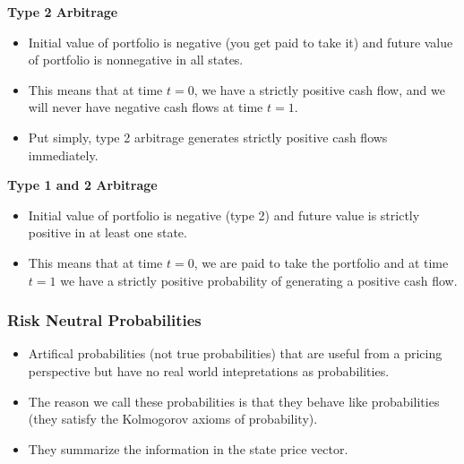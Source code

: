 \documentclass[11pt]{article}
\begin{document}
\textbf{Type 2 Arbitrage}
\begin{itemize}
    \item Initial value of portfolio is negative (you get paid to take it) and future value of 
    portfolio is nonnegative in all states.
    \item This means that at time $t=0$, we have a strictly positive cash flow, and we will 
    never have negative cash flows at time $t=1$.
    \item Put simply, type 2 arbitrage generates strictly positive cash flows immediately.
\end{itemize}

\textbf{Type 1 and 2 Arbitrage}
\begin{itemize}
    \item Initial value of portfolio is negative (type 2) and future value is strictly positive 
    in at least one state.
    \item This means that at time $t=0$, we are paid to take the portfolio and at time $t=1$ 
    we have a strictly positive probability of generating a positive cash flow.
\end{itemize}

\subsubsection{Risk Neutral Probabilities}
\begin{itemize}
    \item Artifical probabilities (not true probabilities) that are useful from a pricing 
    perspective but have no real world intepretations as probabilities.
    \item The reason we call these probabilities is that they behave like probabilities (they
    satisfy the Kolmogorov axioms of probability).
    \item They summarize the information in the state price vector.
\end{itemize}
\end{document}
